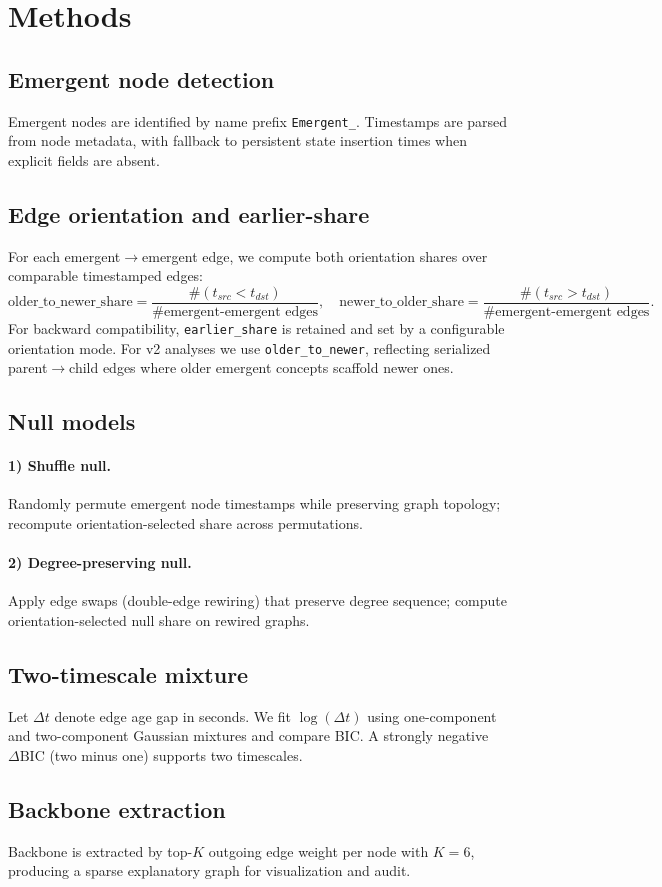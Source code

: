 \section{Methods}
\subsection{Emergent node detection}
Emergent nodes are identified by name prefix \texttt{Emergent\_}. Timestamps are parsed from node metadata, with fallback to persistent state insertion times when explicit fields are absent.

\subsection{Edge orientation and earlier-share}
For each emergent$\rightarrow$emergent edge, we compute both orientation shares over comparable timestamped edges:
\[
\text{older\_to\_newer\_share}=\frac{\#(t_{src}<t_{dst})}{\#\text{emergent-emergent edges}},\quad
\text{newer\_to\_older\_share}=\frac{\#(t_{src}>t_{dst})}{\#\text{emergent-emergent edges}}.
\]
For backward compatibility, \texttt{earlier\_share} is retained and set by a configurable orientation mode. For v2 analyses we use \texttt{older\_to\_newer}, reflecting serialized parent$\rightarrow$child edges where older emergent concepts scaffold newer ones.

\subsection{Null models}
\paragraph{1) Shuffle null.}
Randomly permute emergent node timestamps while preserving graph topology; recompute orientation-selected share across permutations.

\paragraph{2) Degree-preserving null.}
Apply edge swaps (double-edge rewiring) that preserve degree sequence; compute orientation-selected null share on rewired graphs.

\subsection{Two-timescale mixture}
Let $\Delta t$ denote edge age gap in seconds. We fit $\log(\Delta t)$ using one-component and two-component Gaussian mixtures and compare BIC. A strongly negative $\Delta \mathrm{BIC}$ (two minus one) supports two timescales.

\subsection{Backbone extraction}
Backbone is extracted by top-$K$ outgoing edge weight per node with $K=6$, producing a sparse explanatory graph for visualization and audit.
